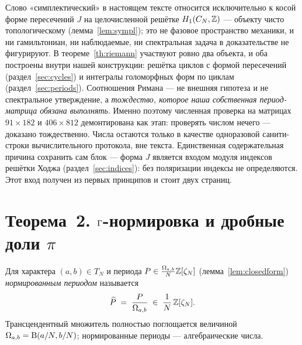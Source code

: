 Слово «симплектический» в настоящем тексте относится исключительно к
косой форме пересечений $J$ на целочисленной решётке
$H_1(C_N,\mathbb{Z})$ --- объекту чисто топологическому
(лемма~\ref{lem:sympl}); это не фазовое пространство механики, и ни
гамильтониан, ни наблюдаемые, ни спектральная задача в доказательстве
не фигурируют. В теореме~\ref{th:riemann} участвуют ровно два объекта,
и оба построены внутри нашей конструкции: решётка циклов с формой
пересечений (раздел~\ref{sec:cycles}) и интегралы голоморфных форм по
циклам (раздел~\ref{sec:periods}). Соотношения Римана --- не внешняя
гипотеза и не спектральное утверждение, а \emph{тождество, которое
наша собственная период-матрица обязана выполнять}. Именно поэтому
численная проверка на матрицах $91\times182$ и $406\times812$
демонтирована как этап: проверять числом нечего --- доказано
тождественно. Числа остаются только в качестве одноразовой
санити-строки вычислительного протокола, вне текста. Единственная
содержательная причина сохранить сам блок --- форма $J$ является
входом модуля индексов решётки Ходжа (раздел~\ref{sec:indices}):
без поляризации индексы не определяются. Этот вход получен из первых
принципов и стоит двух страниц.

\section{Теорема~2. $\Gamma$-нормировка и дробные доли $\pi$}\label{sec:normalization}

\begin{definition}\label{def:grossnorm}
Для характера $(a,b)\in T_N$ и периода
$P\in\frac{\Omega_{a,b}}{N}\mathbb{Z}[\zeta_N]$ (лемма~\ref{lem:closedform})
\emph{нормированным периодом} называется
\[
  \widehat{P} \;=\; \frac{P}{\Omega_{a,b}}
  \;\in\;\frac1N\,\mathbb{Z}[\zeta_N].
\]
Трансцендентный множитель полностью поглощается величиной
$\Omega_{a,b}=\mathrm{B}(a/N,b/N)$; нормированные периоды ---
алгебраические числа.
\end{definition}


